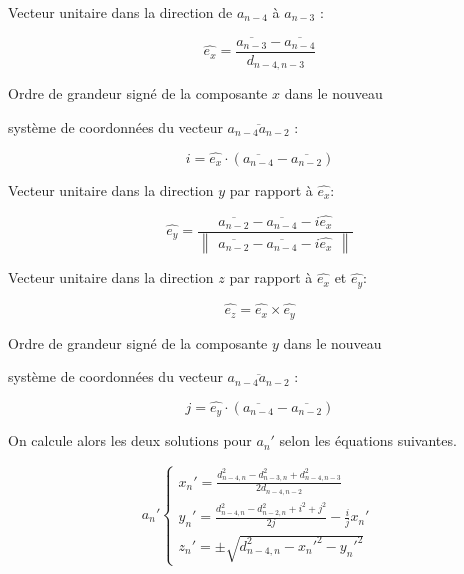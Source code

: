 \vspace{0.4cm}

\centerline{Vecteur unitaire dans la direction de $a_{n-4}$ à $a_{n-3}$ :}

\[
\hat{e_x} = \frac{\overline{a_{n-3}}-\overline{a_{n-4}}}{d_{n-4,n-3}}
\]

\vspace{0.4cm}

\centerline{Ordre de grandeur signé de la composante $x$ dans le nouveau}
\centerline{ système de coordonnées du vecteur $\overline{a_{n-4}a_{n-2}}$ : }
\[
i = \hat{e_x}\cdot(\overline{a_{n-4}}-\overline{a_{n-2}})
\]

\vspace{0.4cm}

\centerline{Vecteur unitaire dans la direction $y$ par rapport à $\hat{e_x}$:}
\[
\hat{e_y} = \frac{\overline{a_{n-2}}-\overline{a_{n-4}}-i\hat{e_x}}{\begin{Vmatrix}\overline{a_{n-2}}-\overline{a_{n-4}}-i\hat{e_x}\end{Vmatrix}}
\]

\vspace{0.4cm}

\centerline{Vecteur unitaire dans la direction $z$ par rapport à $\hat{e_x}$ et $\hat{e_y}$:}
\[
\hat{e_z} = \hat{e_x}\times\hat{e_y}
\]

\vspace{0.4cm}

\centerline{Ordre de grandeur signé de la composante $y$ dans le nouveau}
\centerline{ système de coordonnées du vecteur $\overline{a_{n-4}a_{n-2}}$ : }
\[
j = \hat{e_y}\cdot(\overline{a_{n-4}}-\overline{a_{n-2}})
\]

\vspace{0.4cm}
\par On calcule alors les deux solutions pour $a_n'$ selon les équations suivantes.

\vspace{0.4cm}

\begin{equation}
a_{n}'\left \{
   	\begin{array}{l}
      x_{n}'= \frac{d_{n-4,n}^2 - d_{n-3,n}^2 + d_{n-4,n-3}^2}{2d_{n-4,n-2}}\\
      y_{n}'= \frac{d_{n-4,n}^2 - d_{n-2,n}^2 + i^2 + j^2}{2j}-\frac{i}{j}x_{n}'\\
	  z_{n}'= \pm\sqrt{d_{n-4,n}^2 - x_{n}'^2 - y_{n}'^2}
   	\end{array}
   	\right .
   	\:
   	\label{an_prime}
\end{equation}


